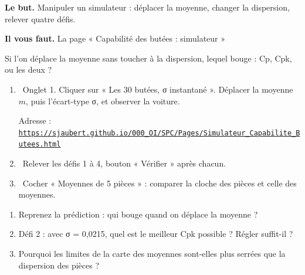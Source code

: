 \documentclass[10pt,a4paper]{article}
\begin{document}
\thispagestyle{fancy}
\begin{tcolorbox}[boite]\textbf{Le but.} Manipuler un simulateur : déplacer la moyenne, changer la dispersion, relever quatre défis.\par\textbf{Il vous faut.} La page « Capabilité des butées : simulateur »\end{tcolorbox}
\begin{tcolorbox}[pred]Si l'on déplace la moyenne sans toucher à la dispersion, lequel bouge : Cp, Cpk, ou les deux ?\reponse\end{tcolorbox}
\begin{enumerate}[label=\textcolor{cyan}{\textbf{\arabic*.}},leftmargin=15pt,itemsep=1.5pt]
\item \tagW\ Onglet 1. Cliquer sur « Les 30 butées, σ instantané ». Déplacer la moyenne $m$, puis l'écart-type σ, et observer la voiture.\par Adresse : \href{https://sjaubert.github.io/000_OI/SPC/Pages/Simulateur_Capabilite_Butees.html}{\nolinkurl{https://sjaubert.github.io/000_OI/SPC/Pages/Simulateur_Capabilite_Butees.html}}
\item \tagW\ Relever les défis 1 à 4, bouton « Vérifier » après chacun.
\item \tagW\ Cocher « Moyennes de 5 pièces » : comparer la cloche des pièces et celle des moyennes.
\end{enumerate}
\par
{}
\begin{enumerate}[label=\textcolor{cyan}{\textbf{Q\arabic*.}},leftmargin=22pt]
\item Reprenez la prédiction : qui bouge quand on déplace la moyenne ?\reponse[1]
\item Défi 2 : avec σ = 0,0215, quel est le meilleur Cpk possible ? Régler suffit-il ?\reponse[2]
\item Pourquoi les limites de la carte des moyennes sont-elles plus serrées que la dispersion des pièces ?\reponse[2]
\end{enumerate}
\end{document}
